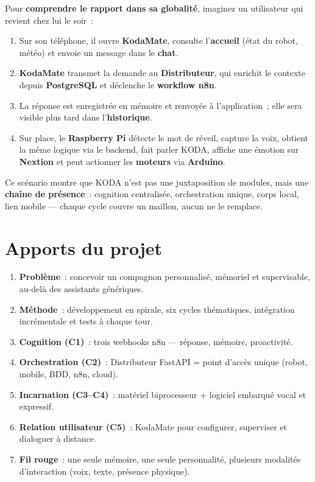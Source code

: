 \documentclass[a4paper,12pt]{report}
\begin{document}
	Pour \textbf{comprendre le rapport dans sa globalité}, imaginez un utilisateur qui
	revient chez lui le soir~:
	\begin{enumerate}
		\item Sur son téléphone, il ouvre \textbf{KodaMate}, consulte l'\textbf{accueil}
		(état du robot, météo) et envoie un message dans le \textbf{chat}.
		\item \textbf{KodaMate} transmet la demande au \textbf{Distributeur}, qui enrichit
		le contexte depuis \textbf{PostgreSQL} et déclenche le \textbf{workflow n8n}.
		\item La réponse est enregistrée en mémoire et renvoyée à l'application~; elle
		sera visible plus tard dans l'\textbf{historique}.
		\item Sur place, le \textbf{Raspberry Pi} détecte le mot de réveil, capture la
		voix, obtient la même logique via le backend, fait parler KODA, affiche une
		émotion sur \textbf{Nextion} et peut actionner les \textbf{moteurs} via
		\textbf{Arduino}.
	\end{enumerate}
	
	Ce scénario montre que KODA n'est pas une juxtaposition de modules, mais une
	\textbf{chaîne de présence}~: cognition centralisée, orchestration unique, corps
	local, lien mobile --- chaque cycle couvre un maillon, aucun ne le remplace.
	
	\section{Apports du projet}
	
	\begin{tcolorbox}[colback=blue!5!white, colframe=blue!60!black,
		title=\textbf{Synthèse --- ce qu'il faut retenir du rapport}]
		\begin{enumerate}[noitemsep]
			\item \textbf{Problème}~: concevoir un compagnon personnalisé, mémoriel et
			supervisable, au-delà des assistants génériques.
			\item \textbf{Méthode}~: développement en spirale, six cycles thématiques,
			intégration incrémentale et tests à chaque tour.
			\item \textbf{Cognition (C1)}~: trois webhooks n8n --- réponse, mémoire,
			proactivité.
			\item \textbf{Orchestration (C2)}~: Distributeur FastAPI = point d'accès unique
			(robot, mobile, BDD, n8n, cloud).
			\item \textbf{Incarnation (C3--C4)}~: matériel biprocesseur + logiciel embarqué
			vocal et expressif.
			\item \textbf{Relation utilisateur (C5)}~: KodaMate pour configurer, superviser
			et dialoguer à distance.
			\item \textbf{Fil rouge}~: une seule mémoire, une seule personnalité, plusieurs
			modalités d'interaction (voix, texte, présence physique).
		\end{enumerate}
	\end{tcolorbox}
	
\end{document}
